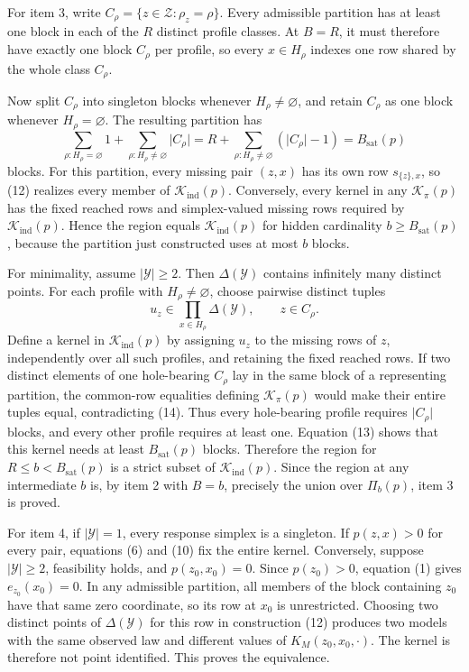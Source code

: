 For item 3, write
\(C_\rho=\{z\in\mathcal Z:\rho_z=\rho\}\).  Every admissible partition
has at least one block in each of the \(R\) distinct profile classes.
At \(B=R\), it must therefore have exactly one block \(C_\rho\) per
profile, so every \(x\in H_\rho\) indexes one row shared by the whole
class \(C_\rho\).

Now split \(C_\rho\) into singleton blocks whenever
\(H_\rho\ne\varnothing\), and retain \(C_\rho\) as one block whenever
\(H_\rho=\varnothing\).  The resulting partition has
\[
 \sum_{\rho:H_\rho=\varnothing}1
 +\sum_{\rho:H_\rho\ne\varnothing}\lvert C_\rho\rvert
 =R+\sum_{\rho:H_\rho\ne\varnothing}
       (\lvert C_\rho\rvert-1)
 =B_{\mathrm{sat}}(p)
 \tag{13}
\]
blocks.  For this partition, every missing pair \((z,x)\) has its own
row \(s_{\{z\},x}\), so (12) realizes every member of
\(\mathcal K_{\mathrm{ind}}(p)\).  Conversely, every kernel in any
\(\mathcal K_\pi(p)\) has the fixed reached rows and simplex-valued
missing rows required by \(\mathcal K_{\mathrm{ind}}(p)\).  Hence the
region equals \(\mathcal K_{\mathrm{ind}}(p)\) for hidden cardinality
\(b\geq B_{\mathrm{sat}}(p)\), because the partition just constructed
uses at most \(b\) blocks.

For minimality, assume \(\lvert\mathcal Y\rvert\geq2\).  Then
\(\Delta(\mathcal Y)\) contains infinitely many distinct points.  For
each profile with \(H_\rho\ne\varnothing\), choose pairwise distinct
tuples
\[
 u_z\in\prod_{x\in H_\rho}\Delta(\mathcal Y),
 \qquad z\in C_\rho.
 \tag{14}
\]
Define a kernel in \(\mathcal K_{\mathrm{ind}}(p)\) by assigning
\(u_z\) to the missing rows of \(z\), independently over all such
profiles, and retaining the fixed reached rows.  If two distinct elements
of one hole-bearing \(C_\rho\) lay in the same block of a representing
partition, the common-row equalities defining \(\mathcal K_\pi(p)\)
would make their entire tuples equal, contradicting (14).  Thus every
hole-bearing profile requires \(\lvert C_\rho\rvert\) blocks, and every
other profile requires at least one.  Equation (13) shows that this
kernel needs at least \(B_{\mathrm{sat}}(p)\) blocks.  Therefore the
region for \(R\leq b<B_{\mathrm{sat}}(p)\) is a strict subset of
\(\mathcal K_{\mathrm{ind}}(p)\).  Since the region at any intermediate
\(b\) is, by item 2 with \(B=b\), precisely the union over
\(\Pi_b(p)\), item 3 is proved.

For item 4, if \(\lvert\mathcal Y\rvert=1\), every response simplex is
a singleton.  If \(p(z,x)>0\) for every pair, equations (6) and (10)
fix the entire kernel.  Conversely, suppose
\(\lvert\mathcal Y\rvert\geq2\), feasibility holds, and
\(p(z_0,x_0)=0\).  Since \(p(z_0)>0\), equation (1) gives
\(e_{z_0}(x_0)=0\).  In any admissible partition, all members of the
block containing \(z_0\) have that same zero coordinate, so its row at
\(x_0\) is unrestricted.  Choosing two distinct points of
\(\Delta(\mathcal Y)\) for this row in construction (12) produces two
models with the same observed law and different values of
\(K_M(z_0,x_0,\cdot)\).  The kernel is therefore not point identified.
This proves the equivalence.

